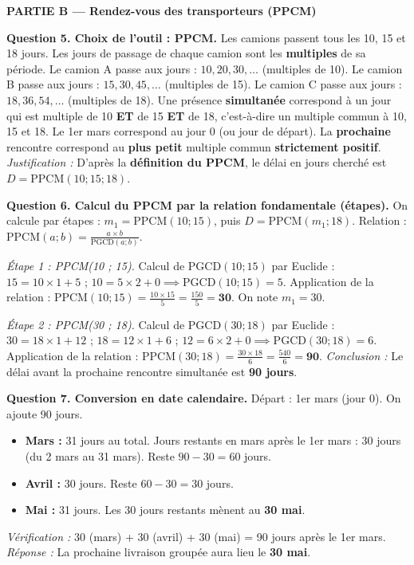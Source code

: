 \documentclass[11pt]{article}
\newcommand{\cle}[1]{{\popxbold\color{popdark}#1}}
\begin{document}
\begin{exoresolu}
\bigskip
\noindent \textbf{PARTIE B — Rendez-vous des transporteurs (PPCM)}

\noindent \textbf{Question 5. Choix de l'outil : PPCM.}
Les camions passent tous les 10, 15 et 18 jours. Les jours de passage de chaque camion sont les \textbf{multiples} de sa période.
Le camion A passe aux jours : $10, 20, 30, \dots$ (multiples de 10).
Le camion B passe aux jours : $15, 30, 45, \dots$ (multiples de 15).
Le camion C passe aux jours : $18, 36, 54, \dots$ (multiples de 18).
Une présence \textbf{simultanée} correspond à un jour qui est multiple de 10 \textbf{ET} de 15 \textbf{ET} de 18, c'est-à-dire un \cle{multiple commun} à 10, 15 et 18.
Le 1er mars correspond au jour 0 (ou jour de départ). La \textbf{prochaine} rencontre correspond au \textbf{plus petit} multiple commun \textbf{strictement positif}.
\emph{Justification :} D'après la \textbf{définition du PPCM}, le délai en jours cherché est $D = \text{PPCM}(10 ; 15 ; 18)$.

\noindent \textbf{Question 6. Calcul du PPCM par la relation fondamentale (étapes).}
On calcule par étapes : $m_1 = \text{PPCM}(10;15)$, puis $D = \text{PPCM}(m_1;18)$.
Relation : $\text{PPCM}(a;b) = \frac{a \times b}{\text{PGCD}(a;b)}$.

\emph{Étape 1 : PPCM(10 ; 15).}
Calcul de $\text{PGCD}(10;15)$ par Euclide :
$15 = 10 \times 1 + 5$ ; $10 = 5 \times 2 + 0 \implies \text{PGCD}(10;15) = 5$.
Application de la relation :
$\text{PPCM}(10;15) = \frac{10 \times 15}{5} = \frac{150}{5} = \mathbf{30}$.
On note $m_1 = 30$.

\emph{Étape 2 : PPCM(30 ; 18).}
Calcul de $\text{PGCD}(30;18)$ par Euclide :
$30 = 18 \times 1 + 12$ ; $18 = 12 \times 1 + 6$ ; $12 = 6 \times 2 + 0 \implies \text{PGCD}(30;18) = 6$.
Application de la relation :
$\text{PPCM}(30;18) = \frac{30 \times 18}{6} = \frac{540}{6} = \mathbf{90}$.
\emph{Conclusion :} Le délai avant la prochaine rencontre simultanée est \textbf{90 jours}.

\noindent \textbf{Question 7. Conversion en date calendaire.}
Départ : 1er mars (jour 0). On ajoute 90 jours.
\begin{itemize}
    \item \textbf{Mars :} 31 jours au total. Jours restants en mars après le 1er mars : 30 jours (du 2 mars au 31 mars). Reste $90 - 30 = 60$ jours.
    \item \textbf{Avril :} 30 jours. Reste $60 - 30 = 30$ jours.
    \item \textbf{Mai :} 31 jours. Les 30 jours restants mènent au \textbf{30 mai}.
\end{itemize}
\emph{Vérification :} 30 (mars) + 30 (avril) + 30 (mai) = 90 jours après le 1er mars.
\emph{Réponse :} La prochaine livraison groupée aura lieu le \textbf{30 mai}.


\end{exoresolu}
\end{document}
